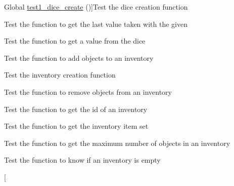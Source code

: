 \begin{DoxyRefList}
%
Global \hyperlink{dice__test_8c_afd8e7b7e3963ce0b48e40a7dcd4fb4b1}{test1\+\_\+dice\+\_\+create} ()]Test the dice creation function  
\item[\label{test__test000053}%
\Hypertarget{test__test000053}%
Global \hyperlink{dice__test_8c_a3e678dfcb1adf09a85eb2e145088d053}{test1\+\_\+dice\+\_\+get\+\_\+last} ()]Test the function to get the last value taken with the given  
\item[\label{test__test000050}%
\Hypertarget{test__test000050}%
Global \hyperlink{dice__test_8c_a60f25d1250ef29f731d5e688fe989557}{test1\+\_\+dice\+\_\+roll} ()]Test the function to get a value from the dice  
\item[\label{test__test000061}%
\Hypertarget{test__test000061}%
Global \hyperlink{inventory__test_8c_ae81ec4669af03331ca8a228567736474}{test1\+\_\+inventory\+\_\+add} ()]Test the function to add objects to an inventory  
\item[\label{test__test000057}%
\Hypertarget{test__test000057}%
Global \hyperlink{inventory__test_8c_a33638f1a88ae16ab8d6bee00145b82b8}{test1\+\_\+inventory\+\_\+create} ()]Test the inventory creation function  
\item[\label{test__test000064}%
\Hypertarget{test__test000064}%
Global \hyperlink{inventory__test_8c_ac67b0f65fccde3f078e6df452e21cee5}{test1\+\_\+inventory\+\_\+dell} ()]Test the function to remove objects from an inventory  
\item[\label{test__test000079}%
\Hypertarget{test__test000079}%
Global \hyperlink{inventory__test_8c_ab9578e8992c9afab849de87a6f5e637a}{test1\+\_\+inventory\+\_\+get\+\_\+id} ()]Test the function to get the id of an inventory  
\item[\label{test__test000059}%
\Hypertarget{test__test000059}%
Global \hyperlink{inventory__test_8c_ad8c004bf0a89d5559e5135a0e0096734}{test1\+\_\+inventory\+\_\+get\+\_\+inside} ()]Test the function to get the inventory item set  
\item[\label{test__test000071}%
\Hypertarget{test__test000071}%
Global \hyperlink{inventory__test_8c_a17c03f02b989bb00b04155c12fe2af9d}{test1\+\_\+inventory\+\_\+get\+\_\+max} ()]Test the function to get the maximum number of objects in an inventory  
\item[\label{test__test000076}%
\Hypertarget{test__test000076}%
Global \hyperlink{inventory__test_8c_a0bfdf05239ed2dbac84e7c1240d27de3}{test1\+\_\+inventory\+\_\+is\+\_\+emty} ()]Test the function to know if an inventory is empty  
\item[\label{test__test000073}%

\end{DoxyRefList}
